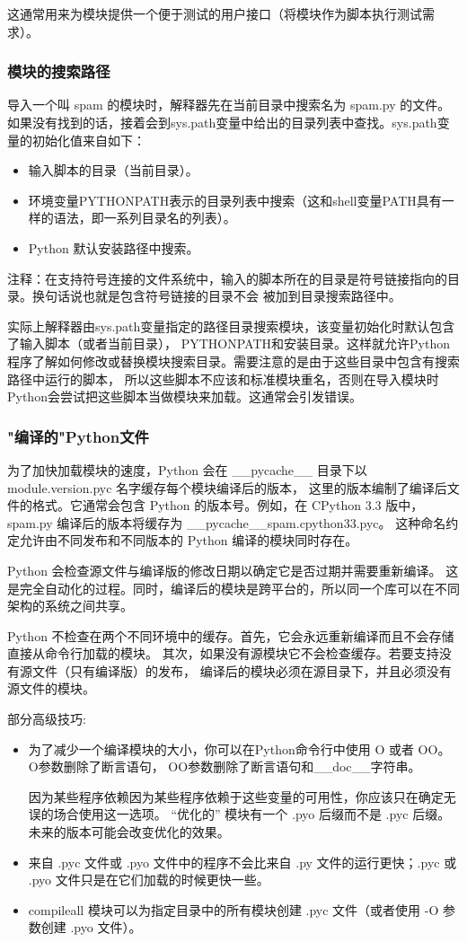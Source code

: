 \documentclass[UTF8]{ctexart}
\begin{document}
这通常用来为模块提供一个便于测试的用户接口（将模块作为脚本执行测试需求）。

\subsubsection{模块的搜索路径}
导入一个叫 spam 的模块时，解释器先在当前目录中搜索名为 spam.py 的文件。
如果没有找到的话，接着会到sys.path变量中给出的目录列表中查找。sys.path变量的初始化值来自如下：
\begin{itemize}
  \item 输入脚本的目录（当前目录）。
  \item 环境变量PYTHONPATH表示的目录列表中搜索（这和shell变量PATH具有一样的语法，即一系列目录名的列表）。
  \item Python 默认安装路径中搜索。
\end{itemize}

注释：在支持符号连接的文件系统中，输入的脚本所在的目录是符号链接指向的目录。换句话说也就是包含符号链接的目录不会
被加到目录搜索路径中。

实际上解释器由sys.path变量指定的路径目录搜索模块，该变量初始化时默认包含了输入脚本（或者当前目录），
PYTHONPATH和安装目录。这样就允许Python程序了解如何修改或替换模块搜索目录。需要注意的是由于这些目录中包含有搜索路径中运行的脚本，
所以这些脚本不应该和标准模块重名，否则在导入模块时Python会尝试把这些脚本当做模块来加载。这通常会引发错误。

\subsubsection{"编译的"Python文件}
为了加快加载模块的速度，Python 会在 \_\_pycache\_\_ 目录下以 module.version.pyc 名字缓存每个模块编译后的版本，
这里的版本编制了编译后文件的格式。它通常会包含 Python 的版本号。例如，在 CPython 3.3 版中，
spam.py 编译后的版本将缓存为 \_\_pycache\_\_\/spam.cpython\-33.pyc。
这种命名约定允许由不同发布和不同版本的 Python 编译的模块同时存在。

Python 会检查源文件与编译版的修改日期以确定它是否过期并需要重新编译。
这是完全自动化的过程。同时，编译后的模块是跨平台的，所以同一个库可以在不同架构的系统之间共享。

Python 不检查在两个不同环境中的缓存。首先，它会永远重新编译而且不会存储直接从命令行加载的模块。
其次，如果没有源模块它不会检查缓存。若要支持没有源文件（只有编译版）的发布，
编译后的模块必须在源目录下，并且必须没有源文件的模块。

部分高级技巧:
\begin{itemize}
  \item 为了减少一个编译模块的大小，你可以在Python命令行中使用 \-O 或者 \-OO。\-O参数删除了断言语句，
  \-OO参数删除了断言语句和\_\_doc\_\_字符串。

  因为某些程序依赖因为某些程序依赖于这些变量的可用性，你应该只在确定无误的场合使用这一选项。
  “优化的” 模块有一个 .pyo 后缀而不是 .pyc 后缀。未来的版本可能会改变优化的效果。
  \item 来自 .pyc 文件或 .pyo 文件中的程序不会比来自 .py 文件的运行更快；.pyc 或 .pyo 文件只是在它们加载的时候更快一些。
  \item compileall 模块可以为指定目录中的所有模块创建 .pyc 文件（或者使用 -O 参数创建 .pyo 文件）。
\end{itemize}
\end{document}
